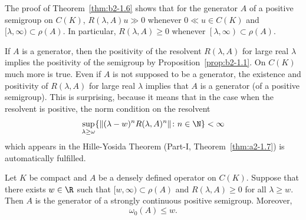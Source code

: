 \begin{remark}\label{rem:b2-1.7}
The proof of Theorem~\ref{thm:b2-1.6} shows that for the generator $A$ of a positive semigroup on $C(K)$, $R(\lambda,A)u \gg 0$ whenever $0 \ll u \in C(K)$ and $[\lambda,\infty) \subset \rho(A)$.
In particular, $R(\lambda,A) \geq 0$ whenever $\left[\lambda,\infty\right) \subset \rho(A)$.
\end{remark}
If\/ $A$ is a generator, then the positivity of the resolvent $R(\lambda,A)$ for large real $\lambda$ implies the positivity of the semigroup by Proposition~\ref{prop:b2-1.1}.
On $C(K)$ much more is true.
Even if\/ $A$ is not supposed to be a generator, the existence and positivity of\/ $R(\lambda,A)$ for large real $\lambda$ implies that $A$ is a generator (of a positive semigroup).
This is surprising, because it means that in the case when the resolvent is positive, the norm condition on the resolvent 
\[
\sup_{\lambda \geq \omega} \{\Vert (\lambda-w)^{n}R(\lambda,A)^{n} \Vert \colon n \in \N \} < \infty
\]
which appears in the Hille-Yosida Theorem (Part-I, Theorem~\ref{thm:a2-1.7}) is automatically fulfilled.
\begin{theorem}\label{thm:b2-1.8}
Let $K$ be compact and $A$ be a densely defined operator on $C(K)$.
Suppose that there exists $w \in \R$ such that $[w,\infty) \subset \rho(A)$ and $R(\lambda,A) \geq 0$ for all $\lambda \geq w$.
Then $A$ is the generator of a strongly continuous positive semigroup.
Moreover,
\begin{equation}\label{eq:b2-1.3}
    \omega_{0}(A) \leq w.
\end{equation}
\end{theorem}
